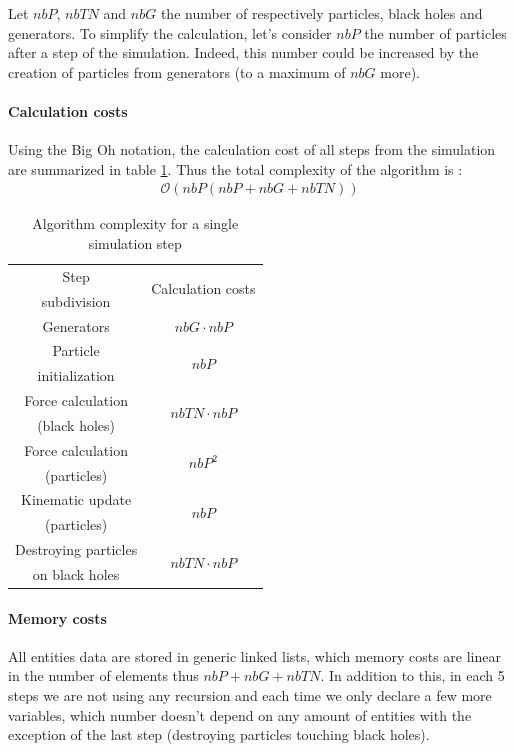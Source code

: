 \documentclass[a4paper]{article} %
\begin{document}
\begin{multicols*}{2}
Let $nbP$, $nbTN$ and $nbG$ the number of respectively particles, black holes and generators.
To simplify the calculation, let's consider $nbP$ the number of particles after a step of the simulation.
Indeed, this number could be increased by the creation of particles from generators (to a maximum of $nbG$ more).



\paragraph{Calculation costs}
Using the Big Oh notation, the calculation cost of all steps from the simulation
are summarized in table \ref{tab-calc}. Thus the total complexity of the algorithm is :
\begin{align}
\mathcal{O}(nbP (nbP + nbG + nbTN))
\end{align}


\begin{table}[H]
\begin{center}
\begin{tabular}{|c|c|}
\hline
Step & \multicolumn{1}{|c|}{\multirow{2}{*}{Calculation costs}} \\
subdivision   &  \\
\hline
\hline
Generators &  $nbG\cdot nbP$\\
\hline
Particle  &       \multicolumn{1}{|c|}{\multirow{2}{*}{$nbP$}}\\
initialization &  \\
\hline
Force calculation  & \multicolumn{1}{|c|}{\multirow{2}{*}{$nbTN\cdot nbP$}}\\
(black holes) &  \\
\hline
Force calculation  & \multicolumn{1}{|c|}{\multirow{2}{*}{$nbP^2$}}\\
(particles) &  \\
\hline
Kinematic update  & \multicolumn{1}{|c|}{\multirow{2}{*}{$nbP$}}\\
(particles) &  \\
\hline
Destroying particles &  \multicolumn{1}{|c|}{\multirow{2}{*}{$nbTN\cdot nbP$}}\\
 on black holes &  \\
\hline
\end{tabular}
\end{center}
\caption{Algorithm complexity for a single simulation step}
\label{tab-calc}
\end{table}

\paragraph{Memory costs} All entities data are stored in generic linked lists,
which memory costs are linear in the number of elements thus $nbP + nbG + nbTN$.
In addition to this, in each 5 steps we are not using any recursion and each time we only
declare a few more variables, which number doesn't depend on any amount of entities
with the exception of the last step (destroying particles touching black holes).


\end{multicols*}
\end{document}
